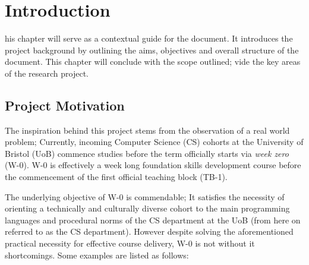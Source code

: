 %
%
\let\textcircled=\pgftextcircled
\chapter{Introduction}
\label{chap:intro}

his chapter will serve as a contextual guide for the document. It introduces the project background by outlining the aims, objectives and overall structure of the document. This chapter will conclude with the scope  outlined; vide the key areas of the research project.


\section{Project Motivation}
\label{sec1:sec01}


The inspiration behind this project stems from the observation of a real world problem; Currently, incoming Computer Science (CS) cohorts at the University of Bristol (UoB) commence studies before the term officially starts via \textit{week zero} (W-0). W-0 is effectively a week long foundation skills development course before the commencement of the first official teaching block (TB-1).

The underlying objective of W-0 is commendable; It satisfies the necessity of orienting a technically and culturally diverse cohort to the main programming languages and procedural norms of the CS department at the UoB (from here on referred to as the CS department). However despite solving the aforementioned practical necessity for effective course delivery, W-0 is not without it shortcomings. Some examples are listed as follows:

